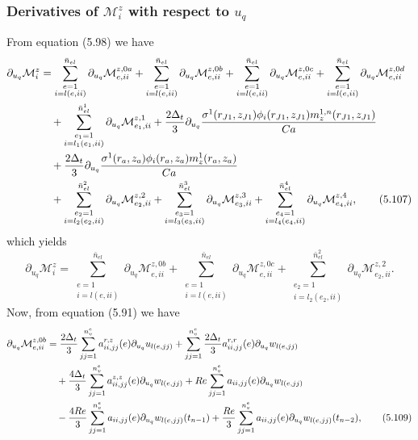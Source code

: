 \documentclass{article}
\begin{document}
\subsubsection{Derivatives of $\mathcal{M}_i^z$ with respect to $u_q$} %
From equation (5.98) we have
\begin{align}
\partial_{u_q}\mathcal{M}_i^z &= \sum_{\substack{e=1\\ i=l(e,ii)}}^{\bar{n}_{el}} \partial_{u_q} \mathcal{M}_{e,ii}^{z,0a} + \sum_{\substack{e=1\\ i=l(e,ii)}}^{\bar{n}_{el}} \partial_{u_q} \mathcal{M}_{e,ii}^{z,0b} + \sum_{\substack{e=1\\ i=l(e,ii)}}^{\bar{n}_{el}} \partial_{u_q} \mathcal{M}_{e,ii}^{z,0c} + \sum_{\substack{e=1\\ i=l(e,ii)}}^{\bar{n}_{el}} \partial_{u_q} \mathcal{M}_{e,ii}^{z,0d} \nonumber\\
&\quad + \sum_{\substack{e_1=1\\ i=l_1(e_1,ii)}}^{\bar{n}_{el}^1} \partial_{u_q} \mathcal{M}_{e_1,ii}^{z,1} + \frac{2\Delta_t}{3} \partial_{u_q} \frac{\sigma^1(r_{J1},z_{J1}) \phi_i(r_{J1},z_{J1}) m_z^{1,n}(r_{J1},z_{J1})}{Ca} \nonumber\\
&\quad + \frac{2\Delta_t}{3} \partial_{u_q} \frac{\sigma^1(r_a,z_a) \phi_i(r_a,z_a) m_z^{1}(r_a,z_a)}{Ca} \nonumber\\
&\quad + \sum_{\substack{e_2=1\\ i=l_2(e_2,ii)}}^{\bar{n}_{el}^2} \partial_{u_q} \mathcal{M}_{e_2,ii}^{z,2} + \sum_{\substack{e_3=1\\ i=l_3(e_3,ii)}}^{\bar{n}_{el}^3} \partial_{u_q} \mathcal{M}_{e_3,ii}^{z,3} + \sum_{\substack{e_4=1\\ i=l_4(e_4,ii)}}^{\bar{n}_{el}^4} \partial_{u_q} \mathcal{M}_{e_4,ii}^{z,4}, \tag{5.107}
\end{align}
which yields
\begin{equation}
\partial_{u_q}\mathcal{M}_i^z = \sum_{\substack{e=1\\ i=l(e,ii)}}^{\bar{n}_{el}} \partial_{u_q} \mathcal{M}_{e,ii}^{z,0b} + \sum_{\substack{e=1\\ i=l(e,ii)}}^{\bar{n}_{el}} \partial_{u_q} \mathcal{M}_{e,ii}^{z,0c} + \sum_{\substack{e_2=1\\ i=l_2(e_2,ii)}}^{\bar{n}_{el}^2} \partial_{u_q} \mathcal{M}_{e_2,ii}^{z,2}. \tag{5.108}
\end{equation}
Now, from equation (5.91) we have
\begin{align}
\partial_{u_q}\mathcal{M}_{e,ii}^{z,0b} &= \frac{2\Delta_t}{3} \sum_{jj=1}^{n_v^e} a_{ii,jj}^{r,z}(e) \partial_{u_q} u_{l(e,jj)} + \sum_{jj=1}^{n_v^e} \frac{2\Delta_t}{3} a_{ii,jj}^{r,r}(e) \partial_{u_q} w_{l(e,jj)} \nonumber\\
&\quad + \frac{4\Delta_t}{3} \sum_{jj=1}^{n_v^e} a_{ii,jj}^{z,z}(e) \partial_{u_q} w_{l(e,jj)} + Re \sum_{jj=1}^{n_v^e} a_{ii,jj}(e) \partial_{u_q} w_{l(e,jj)} \nonumber\\
&\quad - \frac{4Re}{3} \sum_{jj=1}^{n_v^e} a_{ii,jj}(e) \partial_{u_q} w_{l(e,jj)}(t_{n-1}) + \frac{Re}{3} \sum_{jj=1}^{n_v^e} a_{ii,jj}(e) \partial_{u_q} w_{l(e,jj)}(t_{n-2}), \tag{5.109}
\end{align}
\end{document}
